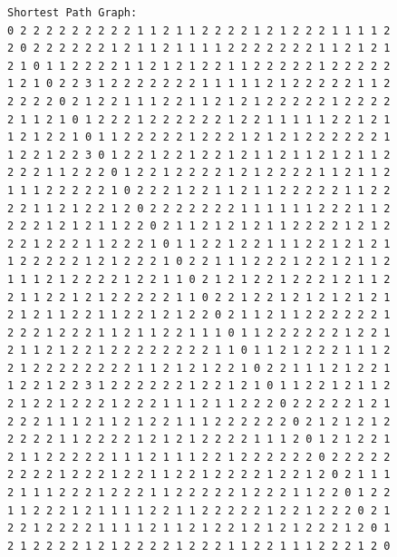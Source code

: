 \documentclass[11pt]{article}
\begin{document}
\begin{lstlisting}
Shortest Path Graph:
0 2 2 2 2 2 2 2 2 2 1 1 2 1 1 2 2 2 2 1 2 1 2 2 2 1 1 1 1 2
2 0 2 2 2 2 2 2 1 2 1 1 2 1 1 1 1 2 2 2 2 2 2 2 1 1 2 1 2 1
2 1 0 1 1 2 2 2 2 1 1 2 1 2 1 2 2 1 1 2 2 2 2 2 1 2 2 2 2 2
1 2 1 0 2 2 3 1 2 2 2 2 2 2 2 1 1 1 1 1 2 1 2 2 2 2 2 1 1 2
2 2 2 2 0 2 1 2 2 1 1 1 2 2 1 1 2 1 2 1 2 2 2 2 2 1 2 2 2 2
2 1 1 2 1 0 1 2 2 2 1 2 2 2 2 2 2 1 2 2 1 1 1 1 1 2 2 1 2 1
1 2 1 2 2 1 0 1 1 2 2 2 2 2 1 2 2 2 1 2 1 2 1 2 2 2 2 2 2 1
1 2 2 1 2 2 3 0 1 2 2 1 2 2 1 2 2 1 2 1 1 2 1 1 2 1 2 1 1 2
2 2 2 1 1 2 2 2 0 1 2 2 1 2 2 2 2 1 2 1 2 2 2 2 1 1 2 1 1 2
1 1 1 2 2 2 2 2 1 0 2 2 2 1 2 2 1 1 2 1 1 2 2 2 2 2 1 1 2 2
2 2 1 1 2 1 2 2 1 2 0 2 2 2 2 2 2 2 1 1 1 1 1 1 2 2 2 1 1 2
2 2 2 1 2 1 2 1 1 2 2 0 2 1 1 2 1 2 1 2 1 1 2 2 2 2 1 2 1 2
2 2 1 2 2 2 1 1 2 2 2 1 0 1 1 2 2 1 2 2 1 1 1 2 2 1 2 1 2 1
1 2 2 2 2 2 1 2 1 2 2 2 1 0 2 2 1 1 1 2 2 2 1 2 2 1 2 1 1 2
1 1 1 2 1 2 2 2 2 1 2 2 1 1 0 2 1 2 1 2 2 1 2 2 2 1 2 1 1 2
2 1 1 2 2 1 2 1 2 2 2 2 2 1 1 0 2 2 1 2 2 1 2 1 2 1 2 1 2 1
2 1 2 1 1 2 2 1 1 2 2 1 2 1 2 2 0 2 1 1 2 1 1 2 2 2 2 2 2 1
2 2 2 1 2 2 2 1 1 2 1 1 2 2 1 1 1 0 1 1 2 2 2 2 2 2 1 2 2 1
2 1 1 2 1 2 2 1 2 2 2 2 2 2 2 2 1 1 0 1 1 2 1 2 2 2 1 1 1 2
2 1 2 2 2 2 2 2 2 2 1 1 2 1 2 1 2 2 1 0 2 2 1 1 1 2 1 2 2 1
1 2 2 1 2 2 3 1 2 2 2 2 2 2 1 2 2 1 2 1 0 1 1 2 2 1 2 1 1 2
2 1 2 2 1 2 2 2 1 2 2 2 1 1 1 2 1 1 2 2 2 0 2 2 2 2 2 1 2 1
2 2 2 1 1 1 2 1 1 2 1 2 2 1 1 1 2 2 2 2 2 2 0 2 1 2 1 2 1 2
2 2 2 2 1 1 2 2 2 2 1 2 1 2 1 2 2 2 2 1 1 1 2 0 1 2 1 2 2 1
2 1 1 2 2 2 2 2 1 1 1 2 1 1 1 2 2 1 2 2 2 2 2 2 0 2 2 2 2 2
2 2 2 2 1 2 2 2 1 2 2 1 1 2 2 1 2 2 2 2 1 2 2 1 2 0 2 1 1 1
2 1 1 1 2 2 2 1 2 2 2 1 1 2 2 2 2 2 1 2 2 2 1 1 2 2 0 1 2 2
1 1 2 2 2 1 2 1 1 1 1 2 2 1 1 2 2 2 2 2 1 2 2 1 2 2 2 0 2 1
2 2 1 2 2 2 2 1 1 1 1 2 1 1 2 1 2 2 1 2 1 2 1 2 2 2 1 2 0 1
2 1 2 2 2 2 1 2 1 2 2 2 2 1 2 2 2 1 1 2 2 1 1 1 2 2 2 1 2 0


\end{lstlisting}
\end{document}
